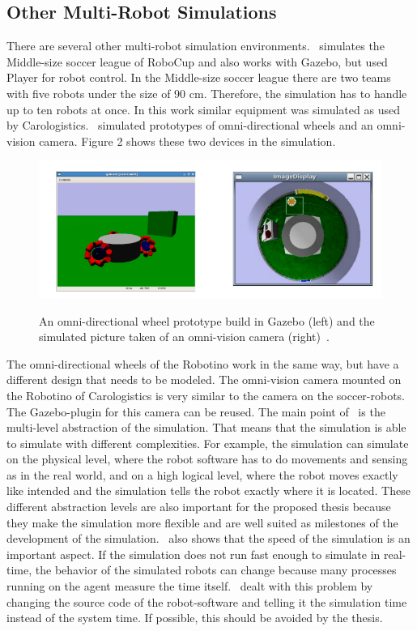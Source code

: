 \documentclass[11pt,a4paper,titlepage]{article}
\begin{document}
\subsection{Other Multi-Robot Simulations}
There are several other multi-robot simulation environments. \cite{MultiLevelAbstraction}~simulates the Middle-size soccer league of RoboCup and also works with Gazebo, but used Player for robot control. In the Middle-size soccer league there are two teams with five robots under the size of 90 cm. Therefore, the simulation has to handle up to ten robots at once. In this work similar equipment was simulated as used by Carologistics. \cite{MultiLevelAbstraction}~simulated prototypes of omni-directional wheels and an omni-vision camera. Figure 2 shows these two devices in the simulation.
\begin{figure}
\includegraphics[scale=0.5]{pics/GazeboEquipment}
\label{Figure 2}
\caption{An omni-directional wheel prototype build in Gazebo (left) and the simulated picture taken of an omni-vision camera (right)~\cite{MultiLevelAbstraction}.}
\end{figure}
The omni-directional wheels of the Robotino work in the same way, but have a different design that needs to be modeled. The omni-vision camera mounted on the Robotino of Carologistics is very similar to the camera on the soccer-robots. The Gazebo-plugin for this camera can be reused. The main point of~\cite{MultiLevelAbstraction} is the multi-level abstraction of the simulation. That means that the simulation is able to simulate with different complexities. For example, the simulation can simulate on the physical level, where the robot software has to do movements and sensing as in the real world, and on a high logical level, where the robot moves exactly like intended and the simulation tells the robot exactly where it is located. These different abstraction levels are also important for the proposed thesis because they make the simulation more flexible and are well suited as milestones of the development of the simulation. \cite{MultiLevelAbstraction}~also shows that the speed of the simulation is an important aspect. If the simulation does not run fast enough to simulate in real-time, the behavior of the simulated robots can change because many processes running on the agent measure the time itself. \cite{MultiLevelAbstraction}~dealt with this problem by changing the source code of the robot-software and telling it the simulation time instead of the system time. If possible, this should be avoided by the thesis.\\
\end{document}
